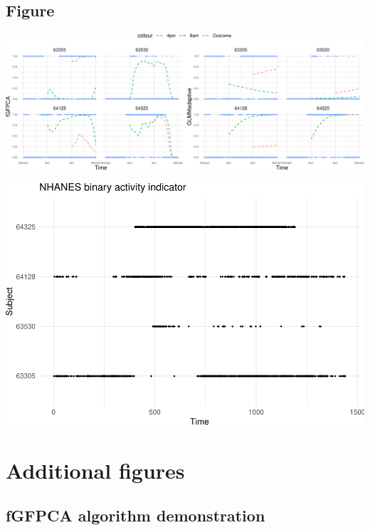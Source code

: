 \documentclass[
]{article}
\begin{document}
\hypertarget{figure-2}{%
\subsection{Figure}\label{figure-2}}

\includegraphics{manuscript_files/figure-latex/pred_nhanes-1.pdf}

\includegraphics{manuscript_files/figure-latex/small_exp-1.pdf}

\hypertarget{additional-figures}{%
\section{Additional figures}\label{additional-figures}}

\hypertarget{fgfpca-algorithm-demonstration}{%
\subsection{fGFPCA algorithm
demonstration}\label{fgfpca-algorithm-demonstration}}
\end{document}
